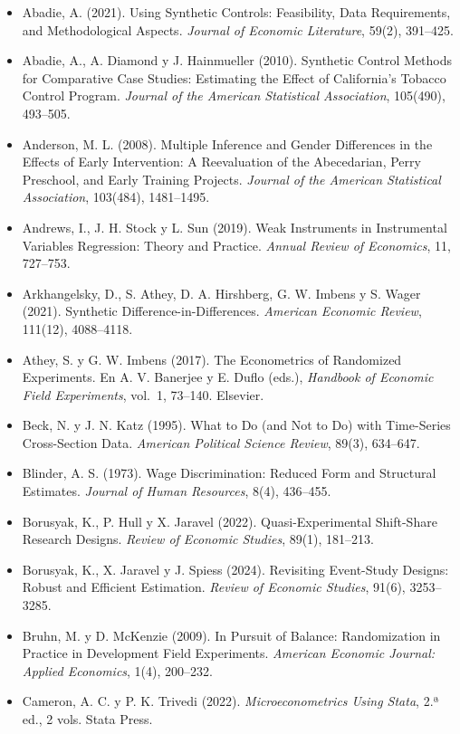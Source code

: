 \documentclass[11pt,a4paper]{article}
\begin{document}
{\small
\begin{itemize}[leftmargin=1.4em,itemsep=1pt,label={}]
\item Abadie, A. (2021). Using Synthetic Controls: Feasibility, Data Requirements, and Methodological Aspects. \emph{Journal of Economic Literature}, 59(2), 391--425.
\item Abadie, A., A. Diamond y J. Hainmueller (2010). Synthetic Control Methods for Comparative Case Studies: Estimating the Effect of California's Tobacco Control Program. \emph{Journal of the American Statistical Association}, 105(490), 493--505.
\item Anderson, M. L. (2008). Multiple Inference and Gender Differences in the Effects of Early Intervention: A Reevaluation of the Abecedarian, Perry Preschool, and Early Training Projects. \emph{Journal of the American Statistical Association}, 103(484), 1481--1495.
\item Andrews, I., J. H. Stock y L. Sun (2019). Weak Instruments in Instrumental Variables Regression: Theory and Practice. \emph{Annual Review of Economics}, 11, 727--753.
\item Arkhangelsky, D., S. Athey, D. A. Hirshberg, G. W. Imbens y S. Wager (2021). Synthetic Difference-in-Differences. \emph{American Economic Review}, 111(12), 4088--4118.
\item Athey, S. y G. W. Imbens (2017). The Econometrics of Randomized Experiments. En A. V. Banerjee y E. Duflo (eds.), \emph{Handbook of Economic Field Experiments}, vol.~1, 73--140. Elsevier.
\item Beck, N. y J. N. Katz (1995). What to Do (and Not to Do) with Time-Series Cross-Section Data. \emph{American Political Science Review}, 89(3), 634--647.
\item Blinder, A. S. (1973). Wage Discrimination: Reduced Form and Structural Estimates. \emph{Journal of Human Resources}, 8(4), 436--455.
\item Borusyak, K., P. Hull y X. Jaravel (2022). Quasi-Experimental Shift-Share Research Designs. \emph{Review of Economic Studies}, 89(1), 181--213.
\item Borusyak, K., X. Jaravel y J. Spiess (2024). Revisiting Event-Study Designs: Robust and Efficient Estimation. \emph{Review of Economic Studies}, 91(6), 3253--3285.
\item Bruhn, M. y D. McKenzie (2009). In Pursuit of Balance: Randomization in Practice in Development Field Experiments. \emph{American Economic Journal: Applied Economics}, 1(4), 200--232.
\item Cameron, A. C. y P. K. Trivedi (2022). \emph{Microeconometrics Using Stata}, 2.ª ed., 2 vols. Stata Press.

\end{itemize}}
\end{document}
